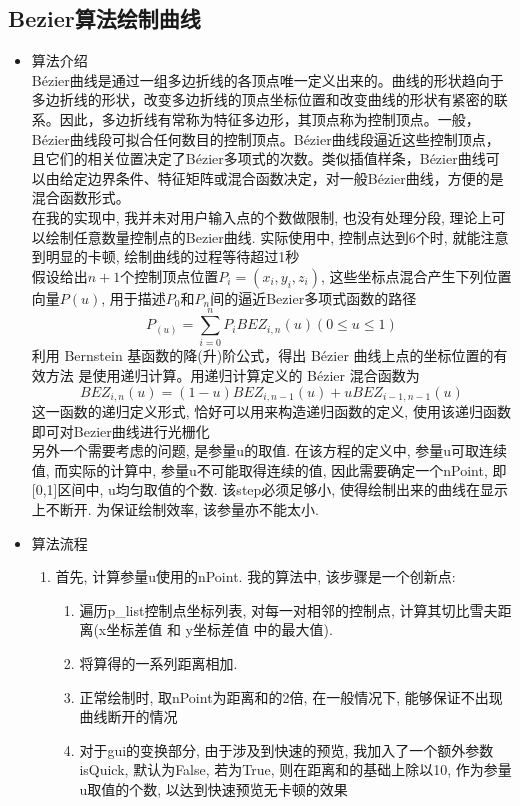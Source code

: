 \documentclass[a4paper,UTF8]{article}
\theoremstyle{definition}
\begin{document}
\subsection{Bezier算法绘制曲线}
\begin{itemize}
  \item 算法介绍\\
  Bézier曲线是通过一组多边折线的各顶点唯一定义出来的。曲线的形状趋向于多边折线的形状，改变多边折线的顶点坐标位置和改变曲线的形状有紧密的联系。因此，多边折线有常称为特征多边形，其顶点称为控制顶点。一般，Bézier曲线段可拟合任何数目的控制顶点。Bézier曲线段逼近这些控制顶点，且它们的相关位置决定了Bézier多项式的次数。类似插值样条，Bézier曲线可以由给定边界条件、特征矩阵或混合函数决定，对一般Bézier曲线，方便的是混合函数形式。\\
  在我的实现中, 我并未对用户输入点的个数做限制, 也没有处理分段, 理论上可以绘制任意数量控制点的Bezier曲线. 实际使用中, 控制点达到6个时, 就能注意到明显的卡顿, 绘制曲线的过程等待超过1秒\\
  假设给出$n+1$个控制顶点位置$P_i=(x_i,y_i,z_i)$, 这些坐标点混合产生下列位置向量$P(u)$, 用于描述$P_0$和$P_n$间的逼近Bezier多项式函数的路径
  $$P_(u)=\sum_{i=0}^nP_iBEZ_{i,n}(u)(0\leq u\leq 1)$$
  利用 Bernstein 基函数的降(升)阶公式，得出 Bézier 曲线上点的坐标位置的有效方法 是使用递归计算。用递归计算定义的 Bézier 混合函数为\cite{sun_2006}
  $$BEZ_{i,n}(u)=(1-u)BEZ_{i, n-1}(u)+ uBEZ_{i-1,n-1}(u)$$
  这一函数的递归定义形式, 恰好可以用来构造递归函数的定义, 使用该递归函数即可对Bezier曲线进行光栅化\\
  另外一个需要考虑的问题, 是参量u的取值. 在该方程的定义中, 参量u可取连续值, 而实际的计算中, 参量u不可能取得连续的值, 因此需要确定一个nPoint, 即[0,1]区间中, u均匀取值的个数. 该step必须足够小, 使得绘制出来的曲线在显示上不断开. 为保证绘制效率, 该参量亦不能太小.
  \item 算法流程
  \begin{enumerate}
    \item 首先, 计算参量u使用的nPoint. 我的算法中, 该步骤是一个创新点:\begin{enumerate}
      \item 遍历p\_list控制点坐标列表, 对每一对相邻的控制点, 计算其切比雪夫距离(x坐标差值 和 y坐标差值 中的最大值). 
      \item 将算得的一系列距离相加.
      \item 正常绘制时, 取nPoint为距离和的2倍, 在一般情况下, 能够保证不出现曲线断开的情况
      \item 对于gui的变换部分, 由于涉及到快速的预览, 我加入了一个额外参数isQuick, 默认为False, 若为True, 则在距离和的基础上除以10, 作为参量u取值的个数, 以达到快速预览无卡顿的效果

\end{enumerate}
\end{enumerate}
\end{itemize}
\end{document}
